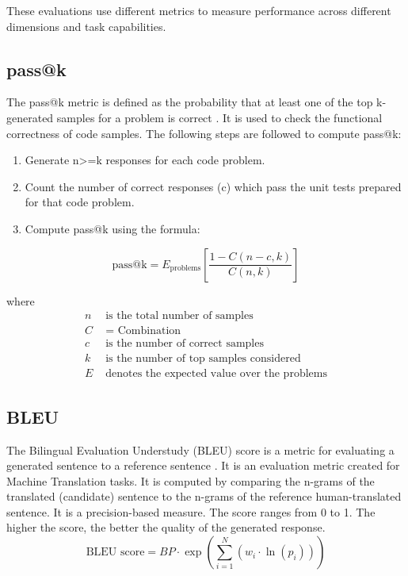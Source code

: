 
These evaluations use different metrics to measure performance across different dimensions and task capabilities. 


\subsection{pass@k} \label{pass@k}
The pass@k metric is defined as the probability that at least one of the top k-generated samples for a problem is correct \cite{chen2021evaluating}. It is used to check the functional correctness of code samples. The following steps are followed to compute pass@k:
\begin{enumerate}
\item Generate n>=k responses for each code problem.
\item Count the number of correct responses (c) which pass the unit tests prepared for that code problem.
\item Compute pass@k using the formula:
\end{enumerate}
\begin{equation}
\text{pass@k} = E_{\text{problems}} \left[ \frac{1 - C(n-c,k)}{C(n,k)} \right]
\end{equation}

where
\begin{align*}
n &\text{ is the total number of samples} \\
C &\text{ = Combination} \\
c &\text{ is the number of correct samples} \\
k &\text{ is the number of top samples considered} \\
E &\text{ denotes the expected value over the problems}
\end{align*}




\subsection{BLEU} \label{bleu}
The Bilingual Evaluation Understudy (BLEU) score is a metric for evaluating a generated sentence to a reference sentence \cite{papineni2002bleu}. It is an evaluation metric created for Machine Translation tasks. It is computed by comparing the n-grams of the translated (candidate) sentence to the n-grams of the reference human-translated sentence. It is a precision-based measure. The score ranges from 0 to 1. The higher the score, the better the quality of the generated response.
\begin{equation}
\text{BLEU score} = BP \cdot \exp\left( \sum_{i=1}^{N} (w_i \cdot \ln(p_i)) \right)
\end{equation}

